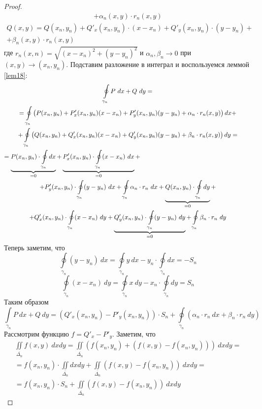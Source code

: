 \begin{proof}
\begin{multline*}
        +\alpha_n(x,y)\cdot r_n(x,y)
    \end{multline*}
    \begin{multline*}
        Q(x,y)=Q(x_n,y_n)+Q'_x(x_n,y_n)\cdot (x-x_n)+Q'_y(x_n,y_n)\cdot (y-y_n)+\\
        +\beta_n(x,y)\cdot r_n(x,y)
    \end{multline*}
    где $r_n(x,n)=\sqrt{(x-x_n)^2+(y-y_n)^2}$ и $\alpha_n, \beta_n\to 0$ при $(x,y)\to (x_n,y_n)$. Подставим разложение в интеграл и воспользуемся леммой \ref{lem18}:
    \begin{multline*}
        \oint\limits_{\gamma_n}P\ dx+ Q\ dy=\\
        =\oint\limits_{\gamma_n}\left(P(x_n,y_n)+P'_x(x_n,y_n)(x-x_n)+P'_y(x_n,y_n)(y-y_n)+\alpha_n\cdot r_n(x,y)\right)dx+\\
        +\oint\limits_{\gamma_n}\left(Q(x_n,y_n)+Q'_x(x_n,y_n)(x-x_n)+Q'_y(x_n,y_n)(y-y_n)+\beta_n\cdot r_n(x,y)\right)dy=\\
        =\underbrace{P(x_n,y_n)\cdot \oint\limits_{\gamma_n}dx}_{=0}+\underbrace{P'_x(x_n,y_n)\cdot \oint\limits_{\gamma_n}(x-x_n)\ dx}_{=0}+\tab[6.2cm]\\
        +P'_y(x_n,y_n)\cdot \oint\limits_{\gamma_n}(y-y_n)\ dx+\oint\limits_{\gamma_n}\alpha_n\cdot r_n\ dx+\underbrace{Q(x_n,y_n)\cdot \oint\limits_{\gamma_n}dy}_{=0}+\\
        +Q'_x(x_n,y_n)\cdot \oint\limits_{\gamma_n}(x-x_n)\ dy+\underbrace{Q'_y(x_n,y_n)\cdot \oint\limits_{\gamma_n}(y-y_n)\ dy}_{=0} + \oint\limits_{\gamma_n}\beta_n\cdot r_n\ dy
    \end{multline*}
    Теперь заметим, что
    \[\oint\limits_{\gamma_n}(y-y_n)\ dx=\oint\limits_{\gamma_n}y\ dx-y_n\cdot \oint\limits_{\gamma_n}dx=-S_n\]
    \[\oint\limits_{\gamma_n}(x-x_n)\ dy=\oint\limits_{\gamma_n}x\ dy-x_n\cdot \oint\limits_{\gamma_n}dy=S_n\]
    Таким образом
    \[\int\limits_{\gamma_n}P\ dx+Q\ dy=(Q'_x(x_n,y_n)-P'_y(x_n,y_n))\cdot S_n+\oint\limits_{\gamma_n}(\alpha_n\cdot r_n\ dx+\beta_n\cdot r_n\ dy)\]
    Рассмотрим функцию $f=Q'_x-P'_y$. Заметим, что
    \begin{multline*}
        \iint\limits_{\overline{\Delta_n}}f(x,y)\ dxdy=\iint\limits_{\overline{\Delta_n}}(f(x_n,y_n)+(f(x,y)-f(x_n,y_n)))\ dxdy=\\
        =f(x_n,y_n)\cdot \iint\limits_{\overline{\Delta_n}} dxdy+\iint\limits_{\overline{\Delta_n}}(f(x,y)-f(x_n,y_n))\ dxdy=\\
        =f(x_n,y_n)\cdot S_n+\iint\limits_{\overline{\Delta_n}}(f(x,y)-f(x_n,y_n))\ dxdy

\end{multline*}
\end{proof}
